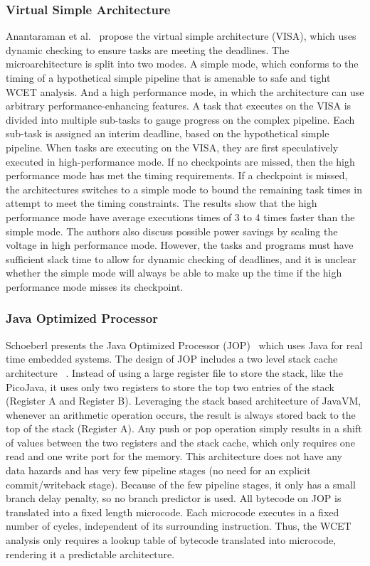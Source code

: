 \subsubsection{Virtual Simple Architecture}
Anantaraman et al.~\cite{Anantaraman2003VISA} propose the virtual simple architecture (VISA), which uses dynamic checking to ensure tasks are meeting the deadlines. 
The microarchitecture is split into two modes. 
A simple mode, which conforms to the timing of a hypothetical simple pipeline that is amenable to safe and tight WCET analysis. 
And a high performance mode, in which the architecture can use arbitrary performance-enhancing features.
A task that executes on the VISA is divided into multiple sub-tasks to gauge progress on the complex pipeline.
Each sub-task is assigned an interim deadline, based on the hypothetical simple pipeline.  
When tasks are executing on the VISA, they are first speculatively executed in high-performance mode.
If no checkpoints are missed, then the high performance mode has met the timing requirements. 
If a checkpoint is missed, the architectures switches to a simple mode to bound the remaining task times in attempt to meet the timing constraints.
The results show that the high performance mode have average executions times of 3 to 4 times faster than the simple mode.
The authors also discuss possible power savings by scaling the voltage in high performance mode.
However, the tasks and programs must have sufficient slack time to allow for dynamic checking of deadlines, and it is unclear whether the simple mode will always be able to make up the time if the high performance mode misses its checkpoint. 

\subsubsection{Java Optimized Processor}
\label{sec:RTJava}
Schoeberl presents the Java Optimized Processor (JOP)~\cite{jop:wcet} which uses Java for real time embedded systems. 
The design of JOP includes a two level stack cache architecture ~\cite{jop:stack}. 
Instead of using a large register file to store the stack, like the PicoJava\cite{McGhan1998PicoJava}, it uses only two registers to store the top two entries of the stack (Register A and Register B). 
Leveraging the stack based architecture of JavaVM, whenever an arithmetic operation occurs, the result is always stored back to the top of the stack (Register A). 
Any push or pop operation simply results in a shift of values between the two registers and the stack cache, which only requires one read and one write port for the memory. 
This architecture does not have any data hazards and has very few pipeline stages (no need for an explicit commit/writeback stage). 
Because of the few pipeline stages, it only has a small branch delay penalty, so no branch predictor is used.
All bytecode on JOP is translated into a fixed length microcode. 
Each microcode executes in a fixed number of cycles, independent of its surrounding instruction.
Thus, the WCET analysis only requires a lookup table of bytecode translated into microcode, rendering it a predictable architecture. 

